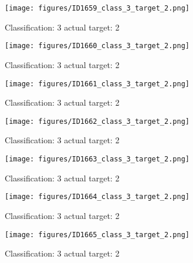 \begin{figure}[h!]
\begin{center}
\texttt{[image: figures/ID1659\_class\_3\_target\_2.png]}
\end{center}
\caption{ Classification: 3 actual target: 2}
\label{fig:ID1659_class_3_target_2}
\end{figure}
\begin{figure}[h!]
\begin{center}
\texttt{[image: figures/ID1660\_class\_3\_target\_2.png]}
\end{center}
\caption{ Classification: 3 actual target: 2}
\label{fig:ID1660_class_3_target_2}
\end{figure}
\begin{figure}[h!]
\begin{center}
\texttt{[image: figures/ID1661\_class\_3\_target\_2.png]}
\end{center}
\caption{ Classification: 3 actual target: 2}
\label{fig:ID1661_class_3_target_2}
\end{figure}
\begin{figure}[h!]
\begin{center}
\texttt{[image: figures/ID1662\_class\_3\_target\_2.png]}
\end{center}
\caption{ Classification: 3 actual target: 2}
\label{fig:ID1662_class_3_target_2}
\end{figure}
\begin{figure}[h!]
\begin{center}
\texttt{[image: figures/ID1663\_class\_3\_target\_2.png]}
\end{center}
\caption{ Classification: 3 actual target: 2}
\label{fig:ID1663_class_3_target_2}
\end{figure}
\begin{figure}[h!]
\begin{center}
\texttt{[image: figures/ID1664\_class\_3\_target\_2.png]}
\end{center}
\caption{ Classification: 3 actual target: 2}
\label{fig:ID1664_class_3_target_2}
\end{figure}
\begin{figure}[h!]
\begin{center}
\texttt{[image: figures/ID1665\_class\_3\_target\_2.png]}
\end{center}
\caption{ Classification: 3 actual target: 2}
\label{fig:ID1665_class_3_target_2}
\end{figure}
